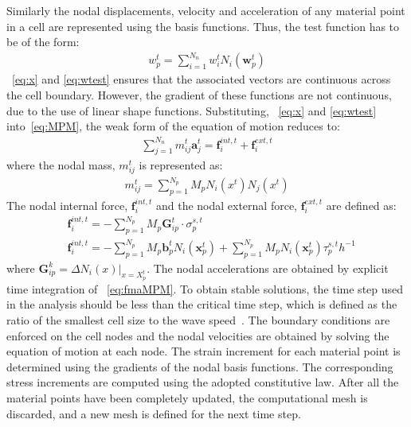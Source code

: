 Similarly the nodal displacements, velocity and acceleration of any material 
point in a cell are represented using the basis functions. Thus, the test 
function has to be of the form:
\begin{align}
\mathbf{\mathit{w}}_{p}^{t} = \sum\limits_{\mathit{i}=1}^{\mathit{N}_{n}} 
\mathbf{\mathit{w}}_{\mathit{i}}^{t}\mathit{N}_{\mathit{i}}(\mathbf{w}_{p}^{t})
\label{eq:wtest}
\end{align}
~\cref{eq:x} and \ref{eq:wtest} ensures that the associated vectors are 
continuous across the cell boundary. However, the gradient of these functions 
are not continuous, due to the use of linear shape functions. Substituting, 
~\cref{eq:x} and \ref{eq:wtest} into~\cref{eq:MPM}, the weak form of the 
equation of motion reduces to:
\begin{align}
\sum\limits_{\mathit{j}=1}^{\mathit{N}_{n}} m_{\mathit{ij}}^{\mathit{t}} 
\mathbf{a}_{\mathit{j}}^{\mathit{t}} = \mathbf{f}_{\mathit{i}}^{int,\mathit{t}} 
+ \mathbf{f}_{\mathit{i}}^{ext,\mathit{t}}
\label{eq:fmaMPM}
\end{align}
where the nodal mass, $m_{\mathit{ij}}^{\mathit{t}}$ is represented as:
\begin{align}
m_{\mathit{ij}}^{\mathit{t}} = \sum\limits_{\mathit{p=1}}^{N_{p}} 
\mathit{M}_{p} \mathit{N}_{\mathit{i}} (\mathbf{\mathit{x}}^{\mathit{t}}) 
\mathit{N}_{\mathit{j}} (\mathbf{\mathit{x}}^{\mathit{t}})
\end{align}
The nodal internal force, $\mathbf{f}_{\mathit{i}}^{int,\mathit{t}}$ and the 
nodal external force, $\mathbf{f}_{\mathit{i}}^{ext,\mathit{t}}$ are defined as:
\begin{align}
\nonumber
& \mathbf{f}_{\mathit{i}}^{int,\mathit{t}} = - 
\sum\limits_{\mathit{p}=1}^{\mathit{N}_{p}}\mathit{M}_{p} \mathbf{G}_{ip}^{t} 
\cdot \sigma_{p}^{\mathit{s,t}} \\ 
& \mathbf{f}_{\mathit{i}}^{int,\mathit{t}} = - 
\sum\limits_{\mathit{p}=1}^{\mathit{N}_{p}}\mathit{M}_{p}  
\mathbf{b}_{p}^{\mathit{t}}\mathit{N}_{\mathit{i}}(\mathbf{x}_{p}^{\mathit{t}}) 
+ \sum\limits_{\mathit{p}=1}^{\mathit{N}_{p}}\mathit{M}_{p} 
\mathit{N}_{\mathit{i}}(\mathbf{x}_{p}^{\mathit{t}}) 
\tau_{p}^{\mathit{s,t}}\mathit{h}^{-1}
\end{align}
where $\mathbf{G}_{\mathit{ip}}^{\mathit{k}} = \Delta \mathit{N}_{\mathit{i}} 
(\mathbf{\mathit{x}})|_{\mathbf{\mathit{x}}=\mathbf{\mathit{X}}_{p}^{\mathit{t}}}$.
The nodal accelerations are obtained by explicit time integration of 
~\cref{eq:fmaMPM}. To obtain stable solutions, the time step used in the 
analysis should be less than the critical time step, which is defined as the 
ratio of the smallest cell size to the wave speed~\citep{Chen2002}. The 
boundary conditions are enforced on the cell nodes and the nodal velocities are 
obtained by solving the equation of motion at each node. The strain increment 
for each material point is determined using the gradients of the nodal basis 
functions. The corresponding stress increments are computed using the adopted 
constitutive law. After all the material points have been completely updated, 
the computational mesh is discarded, and a new mesh is defined for the next 
time step. 

